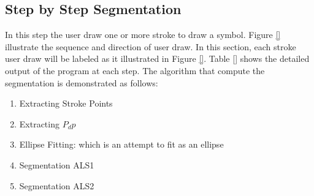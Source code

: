 \subsection{Step by Step Segmentation}
\label{sec:stepseg}
In this step the user draw one or more stroke to draw a symbol. Figure \ref{} illustrate the sequence and direction of user draw. In this section, each stroke user draw will be labeled as it illustrated in Figure \ref{}. Table \ref{} shows the detailed output of the program at each step. The algorithm that compute the segmentation is demonstrated as follows:
\begin{enumerate}
	\item Extracting Stroke Points 
	\item Extracting $P_dp$
\begin{verbatim*}

\end{verbatim*}	
\item Ellipse Fitting: which is an attempt to fit as an ellipse
\begin{verbatim*}

\end{verbatim*}	
\item Segmentation ALS1
\begin{verbatim*}

\end{verbatim*}	
\item Segmentation ALS2
\begin{verbatim*}

\end{verbatim*}	

\end{enumerate}




